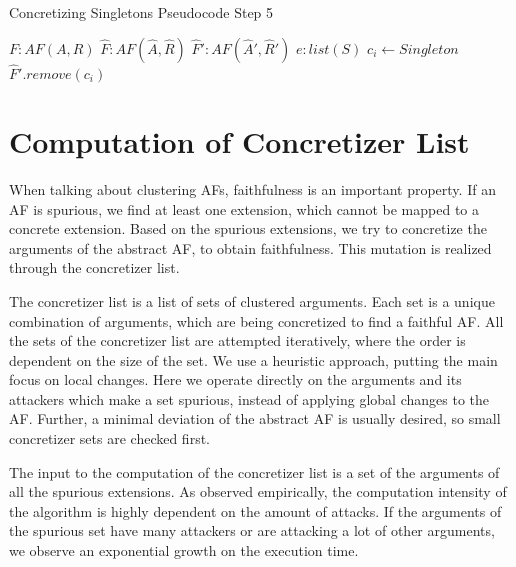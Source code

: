 \begin{algorithm}[H]
    \caption{Concretizing Singletons Pseudocode Step 5}\label{alg:concretizingSingletonsStep5}
    \begin{algorithmic}[1]
        \Require $F: AF(A, R)$ 
        \Require $\hat{F}: AF(\hat{A}, \hat{R})$ 
        \Require $\hat{F}': AF(\hat{A}', \hat{R}')$ 
        \Require $e: list(S)$ 
                \State $c_i \gets Singleton$
                \State $\hat{F}'.remove(c_i)$
            \EndIf
        \EndFor
    \end{algorithmic}
\end{algorithm}


\newpage
\section{Computation of Concretizer List}
\label{sec:ComputationOfConcretizerList}
When talking about clustering AFs, faithfulness is an important property. If an AF is spurious, we find at least one extension, which cannot be mapped to a concrete extension. Based on the spurious extensions, we try to concretize the arguments of the abstract AF, to obtain faithfulness. This mutation is realized through the concretizer list.

The concretizer list is a list of sets of clustered arguments. Each set is a unique combination of arguments, which are being concretized to find a faithful AF. All the sets of the concretizer list are attempted iteratively, where the order is dependent on the size of the set. We use a heuristic approach, putting the main focus on local changes. Here we operate directly on the arguments and its attackers which make a set spurious, instead of applying global changes to the AF. Further, a minimal deviation of the abstract AF is usually desired, so small concretizer sets are checked first.

The input to the computation of the concretizer list is a set of the arguments of all the spurious extensions. 
As observed empirically, the computation intensity of the algorithm is highly dependent on the amount of attacks. If the arguments of the spurious set have many attackers or are attacking a lot of other arguments, we observe an exponential growth on the execution time.


